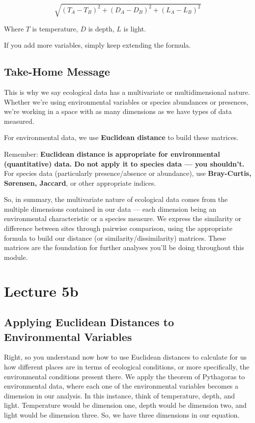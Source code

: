 \documentclass[
  11pt,
]{book}
\begin{document}
\[
\sqrt{(T_A - T_B)^2 + (D_A - D_B)^2 + (L_A - L_B)^2}
\]

Where \(T\) is temperature, \(D\) is depth, \(L\) is light.

If you add more variables, simply keep extending the formula.

\section{Take-Home Message}\label{take-home-message}

This is why we say ecological data has a multivariate or
multidimensional nature. Whether we're using environmental variables or
species abundances or presences, we're working in a space with as many
dimensions as we have types of data measured.

For environmental data, we use \textbf{Euclidean distance} to build
these matrices.

Remember: \textbf{Euclidean distance is appropriate for environmental
(quantitative) data. Do not apply it to species data --- you shouldn't.}
For species data (particularly presence/absence or abundance), use
\textbf{Bray-Curtis, Sørensen, Jaccard}, or other appropriate indices.

So, in summary, the multivariate nature of ecological data comes from
the multiple dimensions contained in our data --- each dimension being
an environmental characteristic or a species measure. We express the
similarity or difference between sites through pairwise comparison,
using the appropriate formula to build our distance (or
similarity/dissimilarity) matrices. These matrices are the foundation
for further analyses you'll be doing throughout this module.

\chapter*{Lecture 5b}\label{lecture-5b}

\section{Applying Euclidean Distances to Environmental
Variables}\label{applying-euclidean-distances-to-environmental-variables}

Right, so you understand now how to use Euclidean distances to calculate
for us how different places are in terms of ecological conditions, or
more specifically, the environmental conditions present there. We apply
the theorem of Pythagoras to environmental data, where each one of the
environmental variables becomes a dimension in our analysis. In this
instance, think of temperature, depth, and light. Temperature would be
dimension one, depth would be dimension two, and light would be
dimension three. So, we have three dimensions in our equation.
\end{document}

